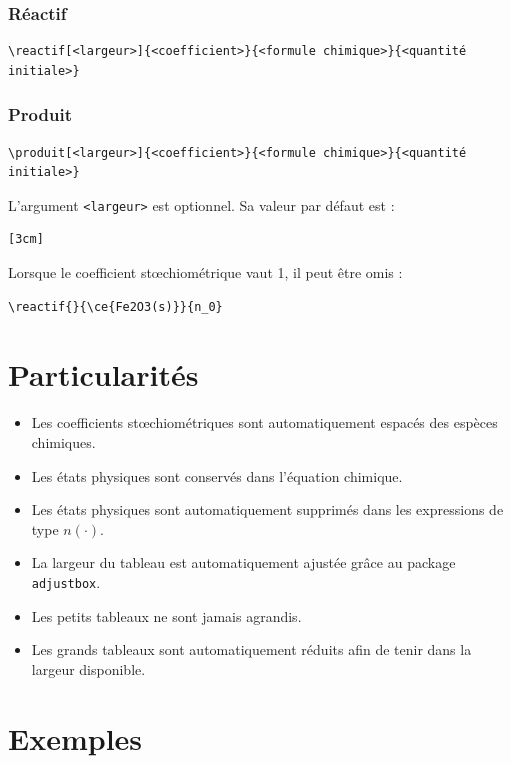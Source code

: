 \documentclass[a4paper,11pt]{article}
\begin{document}
\subsubsection{Réactif}

\begin{verbatim}
\reactif[<largeur>]{<coefficient>}{<formule chimique>}{<quantité initiale>}
\end{verbatim}

\subsubsection{Produit}

\begin{verbatim}
\produit[<largeur>]{<coefficient>}{<formule chimique>}{<quantité initiale>}
\end{verbatim}

L'argument \texttt{<largeur>} est optionnel. Sa valeur par défaut est :

\begin{verbatim}
[3cm]
\end{verbatim}

Lorsque le coefficient stœchiométrique vaut 1, il peut être omis :

\begin{verbatim}
\reactif{}{\ce{Fe2O3(s)}}{n_0}
\end{verbatim}

\section{Particularités}

\begin{itemize}
\item Les coefficients stœchiométriques sont automatiquement espacés des espèces chimiques.
\item Les états physiques sont conservés dans l'équation chimique.
\item Les états physiques sont automatiquement supprimés dans les expressions de type $n(\cdot)$.
\item La largeur du tableau est automatiquement ajustée grâce au package \texttt{adjustbox}.
\item Les petits tableaux ne sont jamais agrandis.
\item Les grands tableaux sont automatiquement réduits afin de tenir dans la largeur disponible.
\end{itemize}

\section{Exemples}
\end{document}

